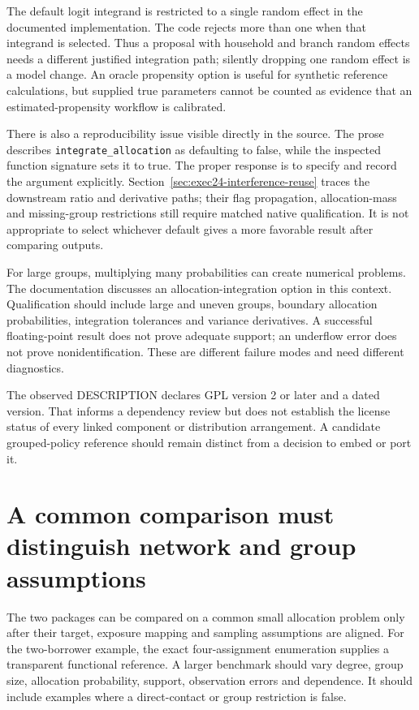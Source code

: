 The default logit integrand is restricted to a single random effect in the
documented implementation. The code rejects more than one when that integrand
is selected. Thus a proposal with household and branch random effects needs a
different justified integration path; silently dropping one random effect is
a model change. An oracle propensity option is useful for synthetic reference
calculations, but supplied true parameters cannot be counted as evidence that
an estimated-propensity workflow is calibrated.

There is also a reproducibility issue visible directly in the source. The prose
describes \texttt{integrate\_allocation} as defaulting to false, while the
inspected function signature sets it to true. The proper response is to specify
and record the argument explicitly. Section~\ref{sec:exec24-interference-reuse}
traces the downstream ratio and derivative paths; their flag propagation,
allocation-mass and missing-group restrictions still require matched native
qualification. It is not appropriate to select whichever default gives a more
favorable result after comparing outputs. \cite{v13_sw_inferference}

For large groups, multiplying many probabilities can create numerical problems.
The documentation discusses an allocation-integration option in this context.
Qualification should include large and uneven groups, boundary allocation
probabilities, integration tolerances and variance derivatives. A successful
floating-point result does not prove adequate support; an underflow error does
not prove nonidentification. These are different failure modes and need
different diagnostics.

The observed DESCRIPTION declares GPL version 2 or later and a dated version.
That informs a dependency review but does not establish the license status of
every linked component or distribution arrangement. A candidate grouped-policy
reference should remain distinct from a decision to embed or port it.

\section{A common comparison must distinguish network and group assumptions}

The two packages can be compared on a common small allocation problem only
after their target, exposure mapping and sampling assumptions are aligned.
For the two-borrower example, the exact four-assignment enumeration supplies a
transparent functional reference. A larger benchmark should vary degree,
group size, allocation probability, support, observation errors and dependence.
It should include examples where a direct-contact or group restriction is false.

